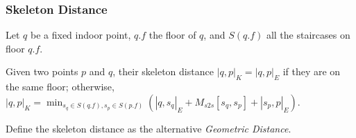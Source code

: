 \begin{frame}
\begin{columns}[c]

\end{columns}

\end{frame}


\begin{frame}
\frametitle{Skeleton Distance}

\textrm{Let $q$ be a fixed indoor point, $q.f$ the floor of $q$, and $S(q.f)$ all the staircases on floor $q.f$.}

\vspace{10pt}
\begin{definition}
  Given two points $p$ and $q$, their skeleton distance $|q,p|_K = |q,p|_E$ if they are on the same floor; otherwise, $|q,p|_K = \min_{s_q \in S(q.f), s_p \in S(p.f)}(|q,s_q|_E + M_{s2s}[s_q,s_p] + |s_p, p|_E)$.
\end{definition}

\vspace{10pt}
Define the skeleton distance as the alternative \emph{Geometric Distance}.

\end{frame}



